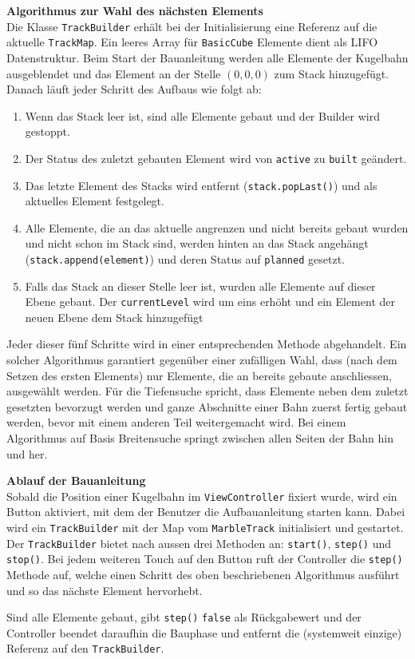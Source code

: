 \begin{description}
	\textbf{Algorithmus zur Wahl des nächsten Elements}\\
	Die Klasse \texttt{TrackBuilder} erhält bei der Initialisierung eine Referenz auf die aktuelle \texttt{TrackMap}. Ein leeres Array für \texttt{BasicCube} Elemente dient als LIFO Datenstruktur. Beim Start der Bauanleitung werden alle Elemente der Kugelbahn ausgeblendet und das Element an der Stelle $(0,0,0)$ zum Stack hinzugefügt. Danach läuft jeder Schritt des Aufbaus wie folgt ab:
	\begin{enumerate}
		\item Wenn das Stack leer ist, sind alle Elemente gebaut und der Builder wird gestoppt.
		\item Der Status des zuletzt gebauten Element wird von \texttt{active} zu \texttt{built} geändert.
		\item Das letzte Element des Stacks wird entfernt (\texttt{stack.popLast()}) und als aktuelles Element festgelegt.
		\item Alle Elemente, die an das aktuelle angrenzen und nicht bereits gebaut wurden und nicht schon im Stack sind, werden hinten an das Stack angehängt (\texttt{stack.append(element)}) und deren Status auf \texttt{planned} gesetzt.
		\item Falls das Stack an dieser Stelle leer ist, wurden alle Elemente auf dieser Ebene gebaut. Der \texttt{currentLevel} wird um eins erhöht und ein Element der neuen Ebene dem Stack hinzugefügt
	\end{enumerate}

	Jeder dieser fünf Schritte wird in einer entsprechenden Methode abgehandelt. Ein solcher Algorithmus garantiert gegenüber einer zufälligen Wahl, dass (nach dem Setzen des ersten Elements) nur Elemente, die an bereits gebaute anschliessen, ausgewählt werden. Für die Tiefensuche spricht, dass Elemente neben dem zuletzt gesetzten bevorzugt werden und ganze Abschnitte einer Bahn zuerst fertig gebaut werden, bevor mit einem anderen Teil weitergemacht wird. Bei einem Algorithmus auf Basis Breitensuche springt zwischen allen Seiten der Bahn hin und her.

	\textbf{Ablauf der Bauanleitung}\\
	Sobald die Position einer Kugelbahn im \texttt{ViewController} fixiert wurde, wird ein Button aktiviert, mit dem der Benutzer die Aufbauanleitung starten kann. Dabei wird ein \texttt{TrackBuilder} mit der Map vom \texttt{MarbleTrack} initialisiert und gestartet. Der \texttt{TrackBuilder} bietet nach aussen drei Methoden an: \texttt{start()}, \texttt{step()} und \texttt{stop()}. Bei jedem weiteren Touch auf den Button ruft der Controller die \texttt{step()} Methode auf, welche einen Schritt des oben beschriebenen Algorithmus ausführt und so das nächste Element hervorhebt.

	Sind alle Elemente gebaut, gibt \texttt{step()} \texttt{false} als Rückgabewert und der Controller beendet daraufhin die Bauphase und entfernt die (systemweit einzige) Referenz auf den \texttt{TrackBuilder}.
\end{description}
